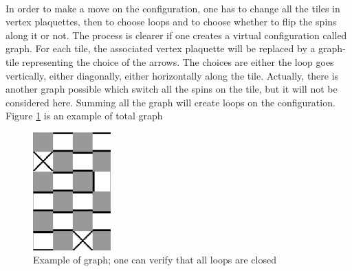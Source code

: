 \documentclass[a4paper,12pt]{article}
\begin{document}
	\paragraph{}
	In order to make a move on the configuration, one has to change all the tiles in vertex plaquettes, then to choose loops and to choose whether to flip the spins along it or not. The process is clearer if one creates a virtual configuration called graph. For each tile, the associated vertex plaquette will be replaced by a graph-tile representing the choice of the arrows. The choices are either the loop goes vertically, either diagonally, either horizontally along the tile. Actually, there is another graph possible which switch all the spins on the tile, but it will not be considered here. Summing all the graph will create loops on the configuration. Figure \ref{graph_example} is an example of total graph
	\begin{figure}[H]
		 \centering
		 \includegraphics[width = 3cm]{random_graph.png}
		 \caption{Example of graph; one can verify that all loops are closed}
		 \label{graph_example}
	\end{figure}
\end{document}
